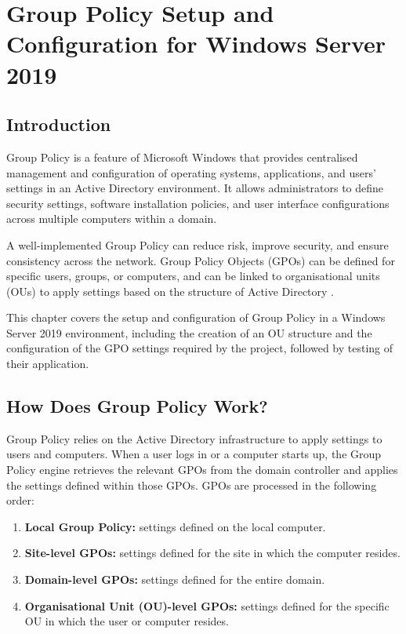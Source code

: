 \chapter{Group Policy Setup and Configuration for Windows Server 2019}
\label{chap:gpo}

\section{Introduction}
\label{sec:gpo-intro}
Group Policy is a feature of Microsoft Windows that provides centralised management and configuration of operating systems, applications, and users' settings in an Active Directory environment. It allows administrators to define security settings, software installation policies, and user interface configurations across multiple computers within a domain.

A well-implemented Group Policy can reduce risk, improve security, and ensure consistency across the network. Group Policy Objects (GPOs) can be defined for specific users, groups, or computers, and can be linked to organisational units (OUs) to apply settings based on the structure of Active Directory \cite{msft-gpo-sec}.

This chapter covers the setup and configuration of Group Policy in a Windows Server 2019 environment, including the creation of an OU structure and the configuration of the GPO settings required by the project, followed by testing of their application.

\section{How Does Group Policy Work?}
\label{sec:gpo-how}
Group Policy relies on the Active Directory infrastructure to apply settings to users and computers. When a user logs in or a computer starts up, the Group Policy engine retrieves the relevant GPOs from the domain controller and applies the settings defined within those GPOs. GPOs are processed in the following order:
\begin{enumerate}
  \item \textbf{Local Group Policy:} settings defined on the local computer.
  \item \textbf{Site-level GPOs:} settings defined for the site in which the computer resides.
  \item \textbf{Domain-level GPOs:} settings defined for the entire domain.
  \item \textbf{Organisational Unit (OU)-level GPOs:} settings defined for the specific OU in which the user or computer resides.
\end{enumerate}

